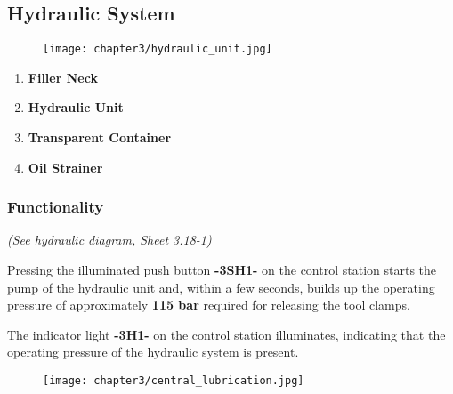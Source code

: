 \newpage
\subsection{Hydraulic System}
\setcounter{page}{3}

\begin{figure}[h]
    \centering
    \texttt{[image: chapter3/hydraulic\_unit.jpg]}
    \label{fig:maho_hydraulic_unit}
\end{figure}

\begin{enumerate}
    \item \textbf{Filler Neck} \footnotemark
    \item \textbf{Hydraulic Unit}
    \item \textbf{Transparent Container}
    \item \textbf{Oil Strainer}
\end{enumerate}



\subsubsection{Functionality}  \footnotemark
{}

\textit{(See hydraulic diagram, Sheet 3.18-1)}

Pressing the illuminated push button \textbf{-3SH1-} on the control station starts the  
pump of the hydraulic unit and, within a few seconds, builds up the operating  
pressure of approximately \textbf{115 bar} required for releasing the tool clamps.  

The indicator light \textbf{-3H1-} on the control station illuminates, indicating  
that the operating pressure of the hydraulic system is present.


\setcounter{section}{20}

\begin{figure}[h]
    \centering
    \texttt{[image: chapter3/central\_lubrication.jpg]}
    \label{fig:maho_central_lubrication}
\end{figure}

